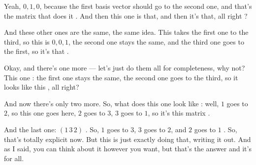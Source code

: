 \begin{speech}[00:15:38 - 00:17:02]
Yeah, $0, 1, 0$, because the first basis vector should go to the second one, and that's the matrix that does it . And then this one is that, and then it's that, all right ?

And these other ones are the same, the same idea. This takes the first one to the third, so this is $0, 0, 1$, the second one stays the same, and the third one goes to the first, so it's that .

Okay, and there's one more --- let's just do them all for completeness, why not? This one : the first one stays the same, the second one goes to the third, so it looks like this , all right?

And now there's only two more. So, what does this one look like : well, $1$ goes to $2$, so this one goes here, $2$ goes to $3$, $3$ goes to $1$, so it's this matrix .

And the last one: $(1\,3\,2)$ . So, $1$ goes to $3$, $3$ goes to $2$, and $2$ goes to $1$ . So, that's totally explicit now. But this is just exactly doing that, writing it out. And as I said, you can think about it however you want, but that's the answer and it's for all.
\end{speech}

